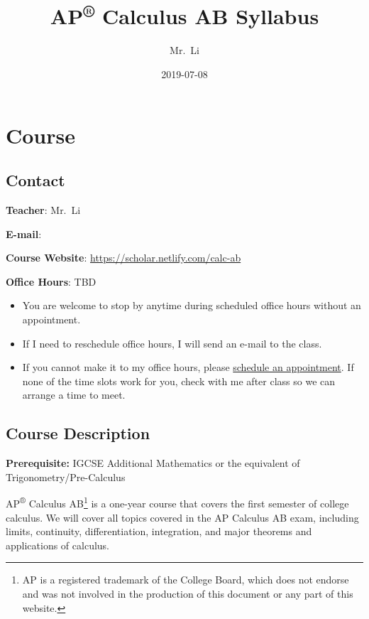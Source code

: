 \documentclass[12pt,fleqn]{article}
\title{AP\textsuperscript{®} Calculus AB Syllabus}
\author{Mr.~Li}
\date{2019-07-08}
\providecommand{\tightlist}{%
  \setlength{\itemsep}{0pt}\setlength{\parskip}{0pt}}
\let\rmarkdownfootnote\footnote%
\def\footnote{\protect\rmarkdownfootnote}
\begin{document}
\maketitle

{
\setcounter{tocdepth}{2}
\tableofcontents
}
\hypertarget{course}{%
\section{Course}\label{course}}

\hypertarget{contact}{%
\subsection{Contact}\label{contact}}

\textbf{Teacher}: Mr.~Li

\textbf{E-mail}:

\textbf{Course Website}: \url{https://scholar.netlify.com/calc-ab}

\textbf{Office Hours}: TBD

\begin{itemize}
\tightlist
\item
  You are welcome to stop by anytime during scheduled office hours without an appointment.
\item
  If I need to reschedule office hours, I will send an e-mail to the class.
\item
  If you cannot make it to my office hours, please \href{https://scholar.netlify.com/\#contact}{schedule an appointment}. If none of the time slots work for you, check with me after class so we can arrange a time to meet.
\end{itemize}

\hypertarget{course-description}{%
\subsection{Course Description}\label{course-description}}

\textbf{Prerequisite:} IGCSE Additional Mathematics or the equivalent of Trigonometry/Pre-Calculus

AP\textsuperscript{®} Calculus AB\footnote{AP is a registered trademark of the College Board, which does not endorse and was not involved in the production of this document or any part of this website.} is a one-year course that covers the first semester of college calculus. We will cover all topics covered in the AP Calculus AB exam, including limits, continuity, differentiation, integration, and major theorems and applications of calculus.
\end{document}
